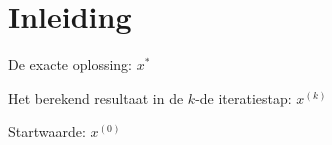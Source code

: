 \documentclass[samenvatting.tex]{subfiles}
\begin{document}
\setcounter{chapter}{7}
\chapter{Inleiding}
\begin{defi}
De exacte oplossing: $x^*$
\end{defi}
\begin{defi}
Het berekend resultaat in de $k$-de iteratiestap: $x^{(k)}$
\end{defi}
\begin{defi}
Startwaarde: $x^{(0)}$
\end{defi}
\end{document}
